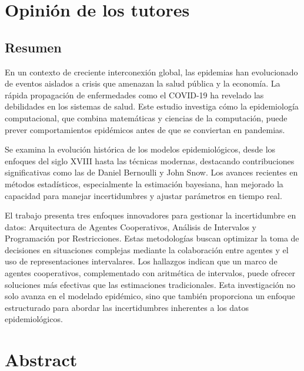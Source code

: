 \documentclass{article}
\begin{document}
\newpage

\section*{ \textbf{ Opinión de los tutores } }


\newpage

\begin{center}
\section*{ \textbf{ Resumen } }
\end{center}

En un contexto de creciente interconexión global, las epidemias han evolucionado de eventos aislados a crisis que amenazan la salud pública y la economía. La rápida propagación de enfermedades como el COVID-19 ha revelado las debilidades en los sistemas de salud. Este estudio investiga cómo la epidemiología computacional, que combina matemáticas y ciencias de la computación, puede prever comportamientos epidémicos antes de que se conviertan en pandemias.

Se examina la evolución histórica de los modelos epidemiológicos, desde los enfoques del siglo XVIII hasta las técnicas modernas, destacando contribuciones significativas como las de Daniel Bernoulli y John Snow. Los avances recientes en métodos estadísticos, especialmente la estimación bayesiana, han mejorado la capacidad para manejar incertidumbres y ajustar parámetros en tiempo real.

El trabajo presenta tres enfoques innovadores para gestionar la incertidumbre en datos: Arquitectura de Agentes Cooperativos, Análisis de Intervalos y Programación por Restricciones. Estas metodologías buscan optimizar la toma de decisiones en situaciones complejas mediante la colaboración entre agentes y el uso de representaciones intervalares. Los hallazgos indican que un marco de agentes cooperativos, complementado con aritmética de intervalos, puede ofrecer soluciones más efectivas que las estimaciones tradicionales. Esta investigación no solo avanza en el modelado epidémico, sino que también proporciona un enfoque estructurado para abordar las incertidumbres inherentes a los datos epidemiológicos.

\newpage

\section*{ \textbf{ Abstract } }
\end{document}
